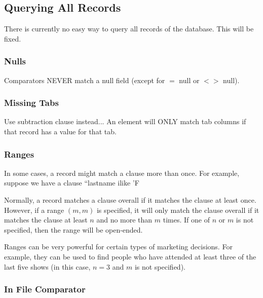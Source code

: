 \documentclass[11pt]{article}
\begin{document}
\subsection{Querying All Records}

There is currently no easy way to query all records of the database.  This will be fixed.

\subsubsection{Nulls}

Comparators NEVER match a null field (except for $=$ null or $\lt\gt$ null).

\subsubsection{Missing Tabs}

Use subtraction clause instead...
An element will ONLY match tab columns if that record has a value for that tab.

\subsubsection{Ranges}

In some cases, a record might match a clause more than once.  For example, suppose we have a clause ``lastname ilike 'F%

Normally, a record matches a clause overall if it matches the clause at least once.  However, if a range $(m,m)$ is specified, it will only match the clause overall if it matches the clause at least $n$ and no more than $m$ times.  If one of $n$ or $m$ is not specified, then the range will be open-ended.

Ranges can be very powerful for certain types of marketing decisions.  For example, they can be used to find people who have attended at least three of the last five shows (in this case, $n=3$ and $m$ is not specified).

\subsubsection{In File Comparator}
\end{document}
